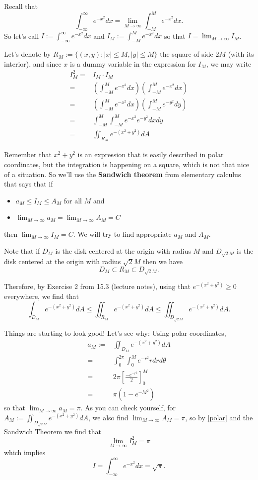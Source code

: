 \documentclass[12pt]{article}
\begin{document}
Recall that $$\int_{-\infty}^\infty e^{-x^2}dx=\lim_{M\to\infty}\int_{-M}^Me^{-x^2}dx.$$ So let's call $I:=\int_{-\infty}^\infty e^{-x^2}dx$ and $I_M:=\int_{-M}^Me^{-x^2}dx$ so that $I=\lim_{M\to\infty}I_M$.

Let's denote by $R_M:=\{(x,y):|x|\leq M,|y|\leq M\}$ the square of side $2M$ (with its interior), and since $x$ is a dummy variable in the expression for $I_M$, we may write
\begin{align*}
I_M^2=&I_M\cdot I_M\\
=&(\int_{-M}^Me^{-x^2}dx)(\int_{-M}^Me^{-x^2}dx)\\
=&(\int_{-M}^Me^{-x^2}dx)(\int_{-M}^Me^{-y^2}dy)\\
=&\int_{-M}^M\int_{-M}^Me^{-x^2}e^{-y^2}dxdy\\
=&\iint_{R_M}e^{-(x^2+y^2)}dA
\end{align*}

Remember that $x^2+y^2$ is an expression that is easily described in polar coordinates, but the integration is happening on a square, which is not that nice of a situation. So we'll use the \textbf{Sandwich theorem} from elementary calculus that says that if\begin{itemize}
\item $a_M\leq I_M\leq A_M$ for all $M$ and 
\item $\lim_{M\to\infty}a_M=\lim_{M\to \infty}A_M=C$ 
\end{itemize}
then $\lim_{M\to \infty}I_M=C$.  We will try to find appropriate $a_M$ and $A_M$.

Note that if $D_M$ is the disk centered at the origin with radius $M$ and $D_{\sqrt{2}M}$ is the disk centered at the origin with radius ${\sqrt{2}M}$ then we have $$D_M\subset R_M\subset D_{\sqrt{2}M}.$$

Therefore, by Exercise 2 from 15.3 (lecture notes), using that $e^{-(x^2+y^2)}\geq 0$ everywhere, we find that \begin{equation}\label{polar}
\int_{D_M}e^{-(x^2+y^2)}dA\leq \iint_{R_M}e^{-(x^2+y^2)}dA\leq \iint_{D_{\sqrt{2}M}}e^{-(x^2+y^2)}dA.
\end{equation}

Things are starting to look good! Let's see why: Using polar coordinates, \begin{align*}a_M:=&\iint_{D_M}e^{-(x^2+y^2)}dA\\
=& \int_0^{2\pi}\int_0^Me^{-r^2}rdrd\theta\\
=& 2\pi[\frac{-e^{-r^2}}{2}]_0^M\\
=& \pi (1-e^{-M^2})
\end{align*}
so that $\lim_{M\to \infty}a_M=\pi$. As you can check yourself, for $A_M:=\iint_{D_{\sqrt{2}M}}e^{-(x^2+y^2)}dA$, we also find $\lim_{M\to \infty}A_M=\pi$, so by \eqref{polar} and the Sandwich Theorem we find that $$\lim_{M\to \infty}I_M^2=\pi$$ which implies $$I=\int_{-\infty}^\infty e^{-x^2}dx=\sqrt{\pi}.$$
\end{document}
